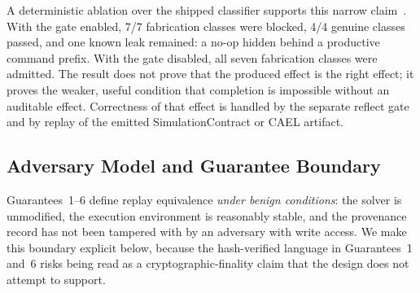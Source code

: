 \documentclass[journal]{IEEEtran}
\newcommand{\cael}{CAEL}
\begin{document}
A deterministic ablation over the shipped classifier supports this narrow
claim~\cite{artifactgateablation2026}. With the gate enabled, 7/7
fabrication classes were blocked, 4/4 genuine classes passed, and one
known leak remained: a no-op hidden behind a productive command prefix.
With the gate disabled, all seven fabrication classes were admitted. The
result does not prove that the produced effect is the right effect; it
proves the weaker, useful condition that completion is impossible without
an auditable effect. Correctness of that effect is handled by the separate
reflect gate and by replay of the emitted SimulationContract or \cael{}
artifact.

\subsection{Adversary Model and Guarantee Boundary}
\label{sec:model:adversary}

Guarantees~1--6 define replay equivalence \emph{under benign conditions}:
the solver is unmodified, the execution environment is
reasonably stable, and the provenance record has not been tampered
with by an adversary with write access. We make this boundary explicit
below, because the hash-verified language in Guarantees~1 and~6 risks
being read as a cryptographic-finality claim that the design does not
attempt to support.
\end{document}
